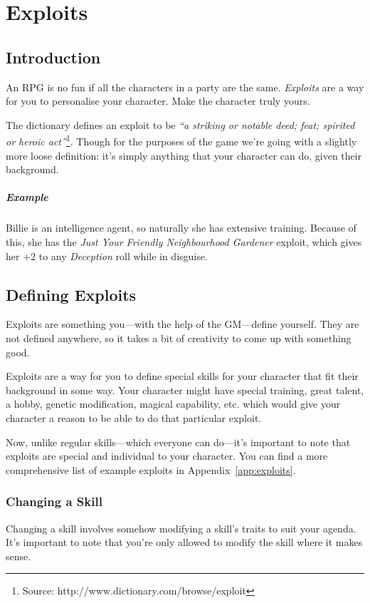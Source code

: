 \chapter{Exploits} \label{chap:exploits}
\section{Introduction}
An RPG is no fun if all the characters in a party are the same. 
\textit{Exploits} are a way for you to personalise your character. 
Make the character truly yours.

The dictionary defines an exploit to be \textit{``a striking or notable deed; feat; spirited or heroic act''}\footnote{Source: http://www.dictionary.com/browse/exploit}. 
Though for the purposes of the game we're going with a slightly more loose definition: it's simply anything that your character can do, given their background.

\paragraph{Example} Billie is an intelligence agent, so naturally she has extensive training. 
Because of this, she has the \textit{Just Your Friendly Neighbourhood Gardener} exploit, which gives her +2 to any \textit{Deception} roll while in disguise.

\section{Defining Exploits}

Exploits are something you---with the help of the GM---define yourself. 
They are not defined anywhere, so it takes a bit of creativity to come up with something good.

Exploits are a way for you to define special skills for your character that fit their background in some way. 
Your character might have special training, great talent, a hobby, genetic modification, magical capability, etc. which would give your character a reason to be able to do that particular exploit.

Now, unlike regular skills---which everyone can do---it's important to note that exploits are special and individual to your character.
You can find a more comprehensive list of example exploits in Appendix~\ref{app:exploits}.

\subsection{Changing a Skill}
Changing a skill involves somehow modifying a skill's traits to suit your agenda. 
It's important to note that you're only allowed to modify the skill where it makes sense. 

